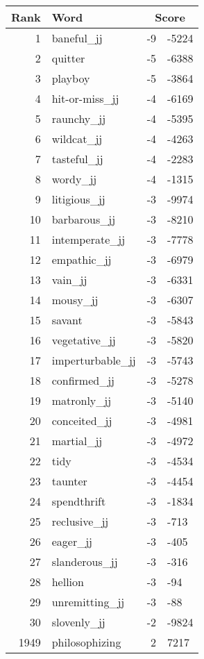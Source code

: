 \begin{longtable}[!htbp]{| rlr@{.}l |}
    \hline
    \textbf{Rank} & \textbf{Word} & \multicolumn{2}{c|}{\textbf{Score}} \\
    \hline
    \endhead
    1 & baneful\_jj & -9 & -5224 \\
    2 & quitter & -5 & -6388 \\
    3 & playboy & -5 & -3864 \\
    4 & hit-or-miss\_jj & -4 & -6169 \\
    5 & raunchy\_jj & -4 & -5395 \\
    6 & wildcat\_jj & -4 & -4263 \\
    7 & tasteful\_jj & -4 & -2283 \\
    8 & wordy\_jj & -4 & -1315 \\
    9 & litigious\_jj & -3 & -9974 \\
    10 & barbarous\_jj & -3 & -8210 \\
    11 & intemperate\_jj & -3 & -7778 \\
    12 & empathic\_jj & -3 & -6979 \\
    13 & vain\_jj & -3 & -6331 \\
    14 & mousy\_jj & -3 & -6307 \\
    15 & savant & -3 & -5843 \\
    16 & vegetative\_jj & -3 & -5820 \\
    17 & imperturbable\_jj & -3 & -5743 \\
    18 & confirmed\_jj & -3 & -5278 \\
    19 & matronly\_jj & -3 & -5140 \\
    20 & conceited\_jj & -3 & -4981 \\
    21 & martial\_jj & -3 & -4972 \\
    22 & tidy & -3 & -4534 \\
    23 & taunter & -3 & -4454 \\
    24 & spendthrift & -3 & -1834 \\
    25 & reclusive\_jj & -3 & -713 \\
    26 & eager\_jj & -3 & -405 \\
    27 & slanderous\_jj & -3 & -316 \\
    28 & hellion & -3 & -94 \\
    29 & unremitting\_jj & -3 & -88 \\
    30 & slovenly\_jj & -2 & -9824 \\
    1949 & philosophizing & 2 & 7217 \\

\end{longtable}
